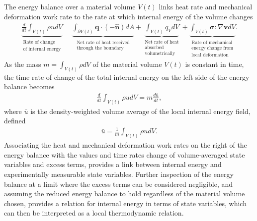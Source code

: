 The energy balance over a material volume $V(t)$ links heat rate and mechanical deformation work rate to the rate at which internal energy of the volume changes
\begin{align}
    \underbrace{\frac{d}{dt}\int_{V(t)}\rho udV}_{\substack{\text{Rate of change}\\\text{of internal energy}}}=\underbrace{\int_{\partial V(t)}\bm{q}\cdot(-\bm{\hat{n}})dA}_{\substack{\text{Net rate of heat received}\\\text{through the boundary}}}+\underbrace{\int_{V(t)}q_VdV}_{\substack{\text{Net rate of heat}\\\text{absorbed}\\\text{volumetrically}}}+\underbrace{\int_{V(t)}\bm{\sigma}:\nabla\bm{v}dV}_{\substack{\text{Rate of mechanical}\\\text{energy change from}\\\text{local deformation}}}.
\end{align}
As the mass $m=\int_{V(t)}\rho dV$ of the material volume $V(t)$ is constant in time, the time rate of change of the total internal energy on the left side of the energy balance becomes
\begin{align}
    \frac{d}{dt}\int_{V(t)}\rho udV=m\frac{d\bar{u}}{dt},
\end{align}
where $\bar{u}$ is the density-weighted volume average of the local internal energy field, defined
\begin{align}
    \bar{u}=\frac{1}{m}\int_{V(t)}\rho u dV.
\end{align}
Associating the heat and mechanical deformation work rates on the right of the energy balance with the values and time rates change of volume-averaged state variables and excess terms, provides a link between internal energy and experimentally measurable state variables. Further inspection of the energy balance at a limit where the excess terms can be considered negligible, and assuming the reduced energy balance to hold regardless of the material volume chosen, provides a relation for internal energy in terms of state variables, which can then be interpreted as a local thermodynamic relation.

